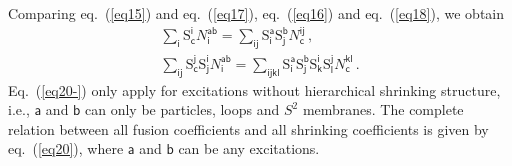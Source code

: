 \documentclass[11pt,nofootinbib,preprint]{revtex4-1}
\begin{document}
Comparing eq.~(\ref{eq15}) and eq.~(\ref{eq17}), eq.~(\ref{eq16}) and eq.~(\ref{eq18}), we obtain
\begin{gather}
	\sum_{\mathsf{i}}{\mathrm{S}_{\mathsf{c}}^{\mathsf{i}}N_{\mathsf{i}}^{\mathsf{ab}}}=\sum_{\mathsf{ij}}{\mathrm{S}_{\mathsf{i}}^{\mathsf{a}}\mathrm{S}_{\mathsf{j}}^{\mathsf{b}}N_{\mathsf{c}}^{\mathsf{ij}}}\,,\label{eq20-}
	\\ \sum_{\mathsf{ij}}{\mathrm{S}_{\mathsf{c}}^{\mathsf{j}}{\mathrm{S}}_{\mathsf{j}}^{\mathsf{i}}N_{\mathsf{i}}^{\mathsf{ab}}}=\sum_{\mathsf{ijkl}}{{\mathrm{S}}_{\mathsf{i}}^{\mathsf{a}}{\mathrm{S}}_{\mathsf{j}}^{\mathsf{b}}\mathrm{S}_{\mathsf{k}}^{\mathsf{i}}\mathrm{S}_{\mathsf{l}}^{\mathsf{j}}}N_{\mathsf{c}}^{\mathsf{kl}}\,.
	\label{eq20}
\end{gather}
Eq.~(\ref{eq20-}) only apply for excitations without hierarchical shrinking structure, i.e., $\mathsf{a}$ and $\mathsf{b}$ can only be particles, loops and $S^2$ membranes. The complete relation between all fusion coefficients and all shrinking coefficients is given by eq.~(\ref{eq20}), where $\mathsf{a}$ and $\mathsf{b}$ can be any excitations.
\end{document}
